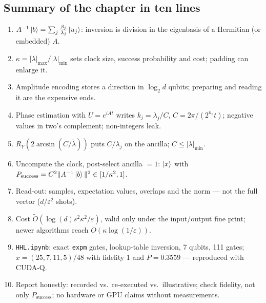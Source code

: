 \documentclass[11pt,a4paper,openany]{book}
\newcommand{\lt}{\tilde\lambda}
\begin{document}
\subsection*{Summary of the chapter in ten lines}
\begin{enumerate}[itemsep=1pt]
\item $A^{-1}\ket b = \sum_j\frac{\beta_j}{\lambda_j}\ket{u_j}$: inversion is division in the eigenbasis of a Hermitian (or embedded) $A$.
\item $\kappa = |\lambda|_{\max}/|\lambda|_{\min}$ sets clock size, success probability and cost; padding can enlarge it.
\item Amplitude encoding stores a direction in $\log_2d$ qubits; preparing and reading it are the expensive ends.
\item Phase estimation with $U = e^{iAt}$ writes $k_j = \lambda_j/C$, $C = 2\pi/(2^{n_c}t)$; negative values in two's complement; non-integers leak.
\item $R_Y(2\arcsin(C/\lt))$ puts $C/\lambda_j$ on the ancilla; $C \le |\lambda|_{\min}$.
\item Uncompute the clock, post-select ancilla $= 1$: $\ket x$ with $P_{\text{success}} = C^2\|A^{-1}\ket b\|^2 \in [1/\kappa^2, 1]$.
\item Read-out: samples, expectation values, overlaps and the norm --- not the full vector ($d/\varepsilon^2$ shots).
\item Cost $\tilde O(\log(d)s^2\kappa^2/\varepsilon)$, valid only under the input/output fine print; newer algorithms reach $O(\kappa\log(1/\varepsilon))$.
\item \texttt{HHL.ipynb}: exact \texttt{expm} gates, lookup-table inversion, 7 qubits, 111 gates; $x = (25, 7, 11, 5)/48$ with fidelity 1 and $P = 0.3559$ --- reproduced with CUDA-Q.
\item Report honestly: recorded vs.\ re-executed vs.\ illustrative; check fidelity, not only $P_{\text{success}}$; no hardware or GPU claims without measurements.
\end{enumerate}
\end{document}
